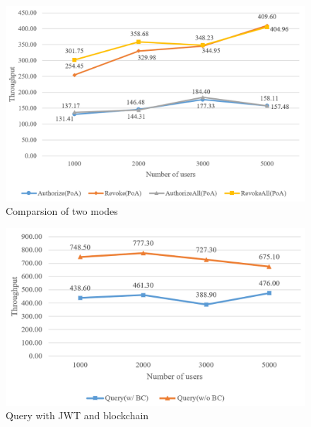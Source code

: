 \begin{figure}[htb]
    \centering
    \includegraphics[height=!,width=1\linewidth,keepaspectratio=true]{figures/authorize_comparsion.png}
    \caption{{\footnotesize Comparsion of two modes}}
    \label{fig:authorize_compare}
\end{figure}

\begin{figure}[htb]
    \centering
    \includegraphics[height=!,width=1\linewidth,keepaspectratio=true]{figures/query.png}
    \caption{{\footnotesize Query with JWT and blockchain}}
    \label{fig:query}
\end{figure}